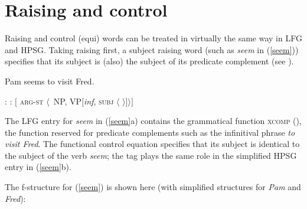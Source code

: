 
\section{Raising and control}
\label{lfg:sec-raising-control}

Raising and control (equi) words can be treated in virtually the same way in LFG and HPSG. Taking raising first, a subject raising word (such as \textit{seem} in (\ref{seem})) specifies that its subject is (also) the subject of its predicate complement (see ).  

\begin{exe} 
\ex	\label{seem}
Pam seems to visit Fred.
\begin{xlist} 
\ex	
{}: \qquad {}
\ex 
{}:  \qquad  $[$ \textsc{arg-st} $\langle$ \,NP, VP[\textit{inf}, \textsc{subj} $\langle$  $ \rangle ] \rangle ]$
\end{xlist}
\end{exe}
The LFG entry for \textit{seem} in (\ref{seem}a) contains the grammatical function \textsc{xcomp} (), the function reserved for predicate complements such as the infinitival phrase \textit{to visit Fred}.  The functional control equation specifies that its subject is identical to the subject of the verb \textit{seem}; the  tag  plays the same role in the simplified HPSG entry in (\ref{seem}b).  

The f-structure for (\ref{seem}) is shown here (with simplified structures for \textit{Pam} and \textit{Fred}):

\begin{exe}
\ex \label{seemfs} 
\end{exe}

